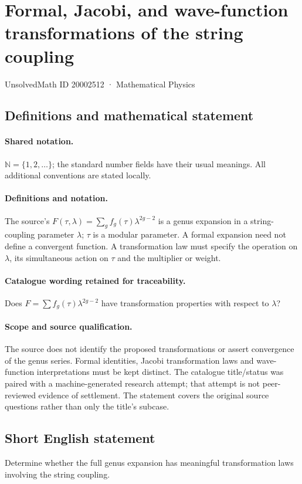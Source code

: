 \documentclass[11pt]{article}
\begin{document}
\setcounter{section}{20002511}
\section{Formal, Jacobi, and wave-function transformations of the string coupling}\label{20002512}
{\small UnsolvedMath ID 20002512 · Mathematical Physics}
\subsection{Definitions and mathematical statement}

\paragraph{Shared notation.}$\mathbb N=\{1,2,\ldots\}$; the standard number fields have their usual meanings. All additional conventions are stated locally.


\paragraph{Definitions and notation.}The source’s $F(\tau,\lambda)=\sum_g f_g(\tau)\lambda^{2g-2}$ is a genus expansion in a string-coupling parameter $\lambda$; $\tau$ is a modular parameter. A formal expansion need not define a convergent function. A transformation law must specify the operation on $\lambda$, its simultaneous action on $\tau$ and the multiplier or weight.

\paragraph{Catalogue wording retained for traceability.}
Does $F= \sum f_g(\tau)\lambda^{2g-2}$ have transformation properties with respect to $\lambda$?
\paragraph{Scope and source qualification.}The source does not identify the proposed transformations or assert convergence of the genus series. Formal identities, Jacobi transformation laws and wave-function interpretations must be kept distinct. The catalogue title/status was paired with a machine-generated research attempt; that attempt is not peer-reviewed evidence of settlement. The statement covers the original source questions rather than only the title’s subcase.
\subsection{Short English statement}
Determine whether the full genus expansion has meaningful transformation laws involving the string coupling.
\end{document}
